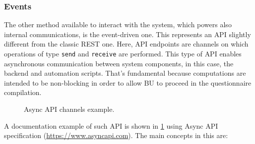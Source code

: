 \documentclass[12pt,a4paper,openright,twoside]{book}
\begin{document}
\subsubsection{Events}

The other method available to interact with the system, which powers also internal communications, is the event-driven one.
%
This represents an \ac{API} slightly different from the classic REST one. 
%
Here, \ac{API} endpoints are channels on which operations of type \texttt{send} and \texttt{receive} are performed.
%
This type of \ac{API} enables asynchronous communication between system components, in this case, the backend and automation scripts.
%
That's fundamental because computations are intended to be non-blocking in order to allow \ac{BU} to proceed in the questionnaire compilation.

\begin{figure}
    \centering
    \hfill
    
    \caption{Async \ac{API} channels example.}%
    \label{fig:async-api}
\end{figure}

A documentation example of such \ac{API} is shown in \cref{fig:async-api} using Async \ac{API} specification (\href{https://www.asyncapi.com}{https://www.asyncapi.com}). The main concepts in this are:
\end{document}
